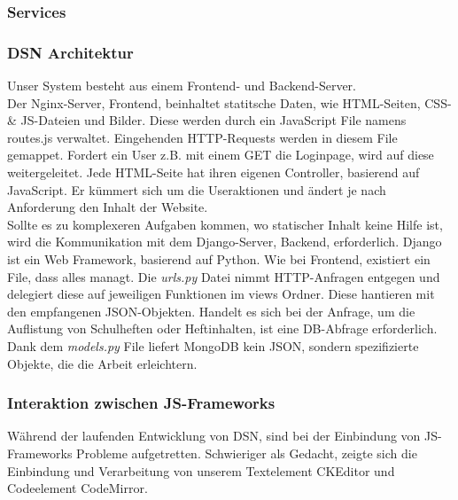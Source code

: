 \subsubsection{Services}

\subsubsection{DSN Architektur}
Unser System besteht aus einem Frontend- und Backend-Server.\\
Der Nginx-Server, Frontend, beinhaltet statitsche Daten, wie HTML-Seiten, CSS- \& JS-Dateien und Bilder. Diese werden durch ein JavaScript File namens routes.js verwaltet. Eingehenden HTTP-Requests werden in diesem File gemappet. Fordert ein User z.B. mit einem GET die Loginpage, wird auf diese weitergeleitet. Jede HTML-Seite hat ihren eigenen Controller, basierend auf JavaScript. Er kümmert sich um die Useraktionen und ändert je nach Anforderung den Inhalt der Website.\\
Sollte es zu komplexeren Aufgaben kommen, wo statischer Inhalt keine Hilfe ist, wird die Kommunikation mit dem Django-Server, Backend, erforderlich. Django ist ein Web Framework, basierend auf Python. Wie bei Frontend, existiert ein File, dass alles managt. Die \textit{urls.py} Datei nimmt HTTP-Anfragen entgegen und delegiert diese auf jeweiligen Funktionen im views Ordner. Diese hantieren mit den empfangenen JSON-Objekten. Handelt es sich bei der Anfrage, um die Auflistung von Schulheften oder Heftinhalten, ist eine DB-Abfrage erforderlich.\\
Dank dem \textit{models.py} File liefert MongoDB kein JSON, sondern spezifizierte Objekte, die die Arbeit erleichtern.

\subsubsection{Interaktion zwischen JS-Frameworks}
Während der laufenden Entwicklung von DSN, sind bei der Einbindung von JS-Frameworks Probleme aufgetretten. Schwieriger als Gedacht, zeigte sich die Einbindung und Verarbeitung von unserem Textelement CKEditor und Codeelement CodeMirror.\\

